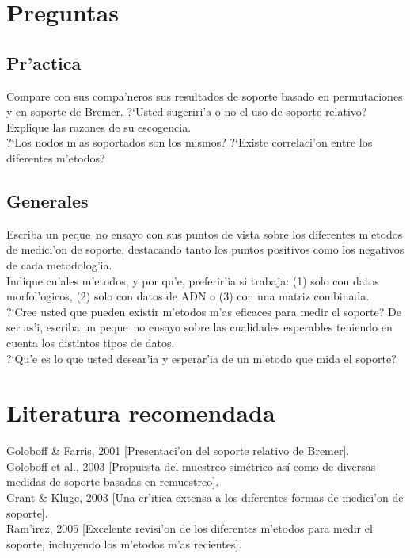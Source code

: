 \section{Preguntas}
\subsection{Pr'actica}
\noindent
Compare con sus compa'neros sus resultados de soporte basado en permutaciones y en soporte de Bremer. ?`Usted sugeriri'a o no el uso de soporte relativo? Explique las razones de su escogencia.\\
?`Los nodos m'as soportados son los mismos? ?`Existe correlaci'on entre los diferentes m'etodos?
\subsection{Generales}
\noindent
Escriba un peque~no ensayo con sus puntos de vista sobre los diferentes m'etodos de medici'on de soporte, destacando tanto los puntos positivos como los negativos de cada metodolog'ia.\\
Indique cu'ales m'etodos, y por qu'e, preferir'ia si trabaja: (1) solo con datos morfol'ogicos, (2) solo con datos de ADN o (3) con una matriz combinada.\\
?`Cree usted que pueden existir m'etodos m'as eficaces para medir el soporte? De ser as'i, escriba un peque~no ensayo sobre las cualidades esperables teniendo en cuenta los distintos tipos de datos.\\
?`Qu'e es lo que usted desear'ia y esperar'ia de un m'etodo que mida el soporte?
\section{Literatura recomendada}
\noindent
Goloboff \& Farris, 2001 [Presentaci'on del soporte relativo de Bremer].\\
Goloboff et al., 2003 [Propuesta del muestreo sim\'etrico as\'i como de diversas medidas de soporte basadas en remuestreo].\\
Grant \& Kluge, 2003 [Una cr'itica extensa a los diferentes formas de medici'on de soporte].\\
Ram'irez, 2005 [Excelente revisi'on de los diferentes m'etodos para medir el soporte, incluyendo los m'etodos m'as recientes].